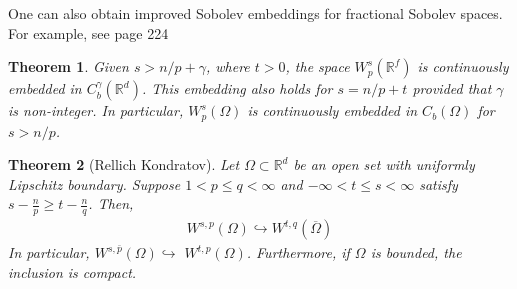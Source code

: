 \documentclass[
    a4paper,
    DIV=14,
    abstract=true,
    numbers=noenddot
]
{scrartcl}
\newtheorem{theorem}{Theorem}[section]
\theoremstyle{definition}
\newcommand{\R}{\mathbb{R}}
\begin{document}
One can also obtain improved Sobolev embeddings for fractional Sobolev spaces. For example, see \cite{agranovich2015sobolev} page 224
\begin{theorem}
    Given $s>n / p + \gamma $,
    where $t>0$, the space $W_p^s\left(\mathbb{R}^f\right)$ is continuously embedded in $C_b^\gamma \left(\mathbb{R}^d\right)$. This embedding also holds for $s=n / p+t$ provided that $\gamma $ is non-integer.
    In particular, $W_p^s\left(\Omega\right)$ is continuously embedded in $C_b\left(\Omega\right)$ for $s>n / p$.
\end{theorem}
\begin{theorem}[Rellich Kondratov]\label{sobolev embeddings}
    Let $\Omega \subset \R^d$ be an open set with uniformly Lipschitz boundary.
    Suppose $1<p \leq q<\infty$ and $-\infty<t \leq s<\infty$ satisfy $s-\frac{n}{p} \geq t-\frac{n}{q}$. Then,
    \begin{align*}
        W^{s, p}\left(\Omega\right) \hookrightarrow W^{t, q}\left(\overline\Omega\right)
    \end{align*}
    In particular, $W^{s, \bar{p}}\left(\Omega\right) \hookrightarrow$ $W^{t, p}\left(\Omega\right)$. Furthermore, if $\Omega $ is bounded, the inclusion is compact.

\end{theorem}






\end{document}
